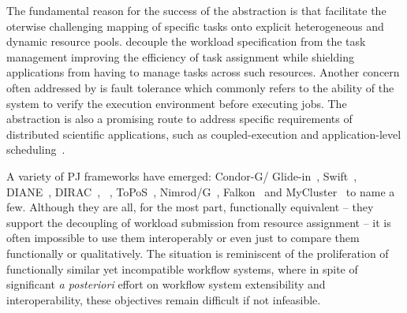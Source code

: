 \documentclass{sig-alternate}
\begin{document}
The fundamental reason for the success of the \pilotjob abstraction is that
\pilotjobs facilitate the oterwise challenging mapping of specific tasks
onto explicit heterogeneous and dynamic resource pools. \pilotjobs decouple the
workload specification from the task management improving the efficiency of
task assignment while shielding applications from having to manage tasks across
such resources. Another concern often
addressed by \pilotjobs is fault tolerance which commonly refers to the ability
of the \pilotjob system to verify the execution environment before executing
jobs. The \pilotjob abstraction is also a promising route to address specific
requirements of distributed scientific applications, such as coupled-execution
and application-level scheduling~\cite{ko-efficient,DBLP:conf/hpdc/KimHMAJ10}.


A variety of PJ frameworks have emerged: Condor-G/ Glide-in~\cite{condor-g},
Swift~\cite{Wilde2011}, DIANE~\cite{Moscicki:908910},
DIRAC~\cite{1742-6596-219-6-062049}, \panda~\cite{1742-6596-219-6-062041},
ToPoS~\cite{topos}, Nimrod/G~\cite{10.1109/HPC.2000.846563},
Falkon~\cite{1362680} and MyCluster~\cite{1652061} to name a few. Although they
are all, for the most part, functionally equivalent -- they support the
decoupling of workload submission from resource assignment -- it is often
impossible to use them interoperably or even just to compare them functionally
or qualitatively. The situation is reminiscent of the proliferation of
functionally similar yet incompatible workflow systems, where in spite of
significant {\it a posteriori} effort on workflow system extensibility and
interoperability, %
these objectives remain difficult if not infeasible.
\end{document}
